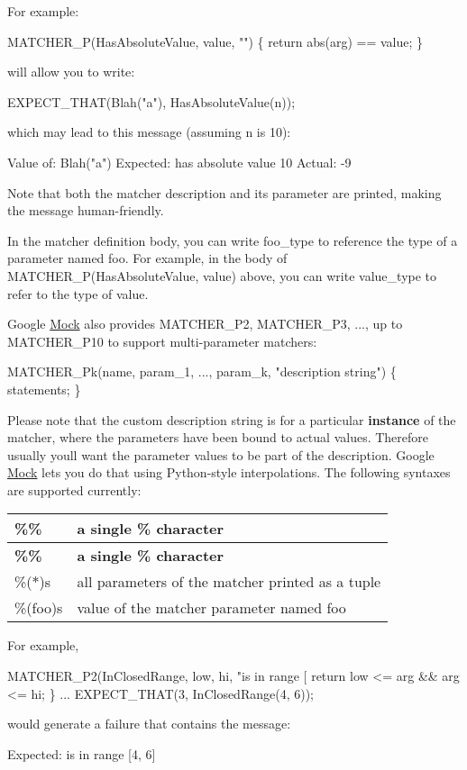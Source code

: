 For example\+: 
\begin{DoxyCode}
MATCHER\_P(HasAbsoluteValue, value, "") \{ return abs(arg) == value; \}
\end{DoxyCode}
 will allow you to write\+: 
\begin{DoxyCode}
EXPECT\_THAT(Blah("a"), HasAbsoluteValue(n));
\end{DoxyCode}
 which may lead to this message (assuming {\ttfamily n} is 10)\+: 
\begin{DoxyCode}
Value of: Blah("a")
Expected: has absolute value 10
  Actual: -9
\end{DoxyCode}


Note that both the matcher description and its parameter are printed, making the message human-\/friendly.

In the matcher definition body, you can write {\ttfamily foo\+\_\+type} to reference the type of a parameter named {\ttfamily foo}. For example, in the body of {\ttfamily M\+A\+T\+C\+H\+E\+R\+\_\+\+P(\+Has\+Absolute\+Value, value)} above, you can write {\ttfamily value\+\_\+type} to refer to the type of {\ttfamily value}.

Google \hyperlink{class_mock}{Mock} also provides {\ttfamily M\+A\+T\+C\+H\+E\+R\+\_\+\+P2}, {\ttfamily M\+A\+T\+C\+H\+E\+R\+\_\+\+P3}, ..., up to {\ttfamily M\+A\+T\+C\+H\+E\+R\+\_\+\+P10} to support multi-\/parameter matchers\+: 
\begin{DoxyCode}
MATCHER\_Pk(name, param\_1, ..., param\_k, "description string") \{ statements; \}
\end{DoxyCode}


Please note that the custom description string is for a particular {\bfseries instance} of the matcher, where the parameters have been bound to actual values. Therefore usually you\textquotesingle{}ll want the parameter values to be part of the description. Google \hyperlink{class_mock}{Mock} lets you do that using Python-\/style interpolations. The following syntaxes are supported currently\+:

\tabulinesep=1mm
\begin{longtabu} spread 0pt [c]{*{2}{|X[-1]}|}
\hline
\rowcolor{\tableheadbgcolor}\textbf{ {\ttfamily \%\%} }&\textbf{ a single {\ttfamily \%} character  }\\
\endfirsthead
\hline
\endfoot
\hline
\rowcolor{\tableheadbgcolor}\textbf{ {\ttfamily \%\%} }&\textbf{ a single {\ttfamily \%} character  }\\
\endhead
{\ttfamily \%($\ast$)s} &all parameters of the matcher printed as a tuple \\
{\ttfamily \%(foo)s} &value of the matcher parameter named {\ttfamily foo} \\
\end{longtabu}
For example, 
\begin{DoxyCode}
MATCHER\_P2(InClosedRange, low, hi, "is in range [%
  return low <= arg && arg <= hi;
\}
...
EXPECT\_THAT(3, InClosedRange(4, 6));
\end{DoxyCode}
 would generate a failure that contains the message\+: 
\begin{DoxyCode}
Expected: is in range [4, 6]
\end{DoxyCode}


